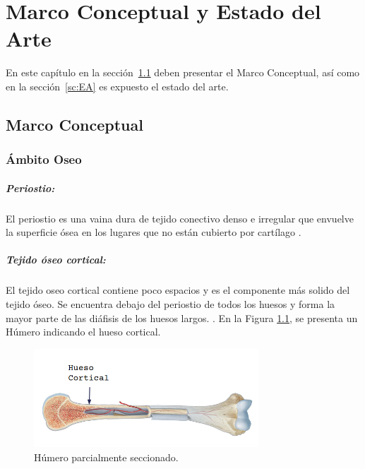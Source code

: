 
\chapter{Marco Conceptual y Estado del Arte}

En este capítulo en la sección~\ref{sc:MC} deben presentar el Marco Conceptual,
así como en la sección~\ref{sc:EA} es expuesto el estado del arte.

\section{Marco Conceptual}
\label{sc:MC}

\subsection{Ámbito Oseo}

\paragraph{Periostio:}
El periostio es una vaina dura de tejido conectivo denso e irregular que envuelve la superficie ósea en los lugares que no están cubierto por cartílago
\cite{tortora/derrickson2018}.


\paragraph{Tejido óseo cortical:}
El tejido oseo cortical contiene poco espacios y es el componente más solido del tejido óseo.
Se encuentra debajo del periostio de todos los huesos y forma la mayor parte de las diáfisis de los huesos largos.
\cite{tortora/derrickson2018}.
En la Figura \ref{fig:humero}, se presenta un Húmero indicando el hueso cortical.

\begin{figure}[H]
    \centering
    \includegraphics[width=0.75\textwidth]{imagenes/humero.png}
    \caption{Húmero parcialmente seccionado.}
    \label{fig:humero}
\end{figure}


